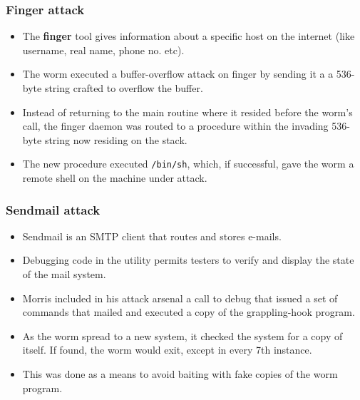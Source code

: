 \documentclass{article}
\theoremstyle{plain}
\theoremstyle{definition}
\begin{document}
\subsubsection{Finger attack}
\begin{itemize}
    \item The \textbf{finger} tool gives information about a specific host on the internet (like username, real name, phone no. etc). 
    
    \item The worm executed a buffer-overflow attack on finger by sending it a a 536-byte string crafted to overflow the buffer. 
    
    \item Instead of returning to the main routine where it resided before the worm's call, the finger daemon was routed to a procedure within the invading 536-byte string now residing on the stack.
    
    \item The new procedure executed \texttt{/bin/sh}, which, if successful, gave the worm a remote shell on the machine under attack.
\end{itemize}

\subsubsection{Sendmail attack}
\begin{itemize}
    \item Sendmail is an SMTP client that routes and stores e-mails. 
    
    \item Debugging code in the utility permits testers to verify and display the state of the mail system.
    
    \item Morris included in his attack arsenal a call to debug that issued a set of commands that mailed and executed a copy of the grappling-hook program.
\end{itemize}

\begin{itemize}
    \item As the worm spread to a new system, it checked the system for a copy of itself. If found, the worm would exit, except in every 7th instance. 
    
    \item This was done as a means to avoid baiting with fake copies of the worm program. 

\end{itemize}
\end{document}
